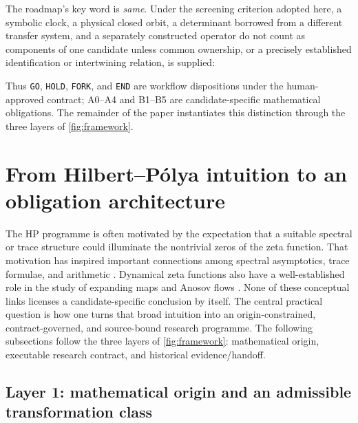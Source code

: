 The roadmap's key word is \emph{same}. Under the \sameobject{} screening
criterion adopted here, a symbolic clock, a physical closed orbit, a
determinant borrowed from a different transfer system, and a separately
constructed operator do not count as components of one candidate unless common
ownership, or a precisely established identification or intertwining relation,
is supplied:

\begin{center}
\end{center}

Thus \texttt{GO}, \texttt{HOLD}, \texttt{FORK}, and \texttt{END} are workflow
dispositions under the human-approved contract; A0--A4 and B1--B5 are
candidate-specific mathematical obligations. The remainder of the paper
instantiates this distinction through the three layers of
\cref{fig:framework}.

\FloatBarrier

\section{From Hilbert--P\'olya intuition to an obligation architecture}
\label{sec:method}

The HP programme is often motivated by the expectation that a suitable spectral
or trace structure could illuminate the nontrivial zeros of the zeta function.
That motivation has inspired important connections among spectral asymptotics,
trace formulae, and arithmetic \citep{BerryKeating1999,Connes1999}. Dynamical
zeta functions also have a well-established role in the study of expanding
maps and Anosov flows \citep{Ruelle1976}. None of these conceptual links
licenses a candidate-specific conclusion by itself. The central practical
question is how one turns that broad intuition into an origin-constrained,
contract-governed, and source-bound research programme. The following
subsections follow the three layers of \cref{fig:framework}: mathematical
origin, executable research contract, and historical evidence/handoff.

\subsection{Layer 1: mathematical origin and an admissible transformation class}
\label{sec:lineage}

